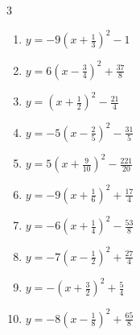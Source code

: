 \begin{multicols}{3}
\begin{enumerate}
  \item $\displaystyle y=-9\left( x+\frac{1}{3}\right)^{2}-1$


  \item $\displaystyle y=6\left( x-\frac{3}{4}\right)^{2}+\frac{37}{8}$


\columnbreak %

\resetques

  \item $\displaystyle y=\left( x+\frac{1}{2}\right)^{2}-\frac{21}{4}$


  \item $\displaystyle y=-5\left( x-\frac{2}{5}\right)^{2}-\frac{31}{5}$


  \item $\displaystyle y=5\left( x+\frac{9}{10}\right)^{2}-\frac{221}{20}$


  \item $\displaystyle y=-9\left( x+\frac{1}{6}\right)^{2}+\frac{17}{4}$


  \item $\displaystyle y=-6\left( x+\frac{1}{4}\right)^{2}-\frac{53}{8}$


  \item $\displaystyle y=-7\left( x-\frac{1}{2}\right)^{2}+\frac{27}{4}$


  \item $\displaystyle y=-\left( x+\frac{3}{2}\right)^{2}+\frac{5}{4}$


  \item $\displaystyle y=-8\left( x-\frac{1}{8}\right)^{2}+\frac{65}{8}$


\end{enumerate}
\end{multicols}
